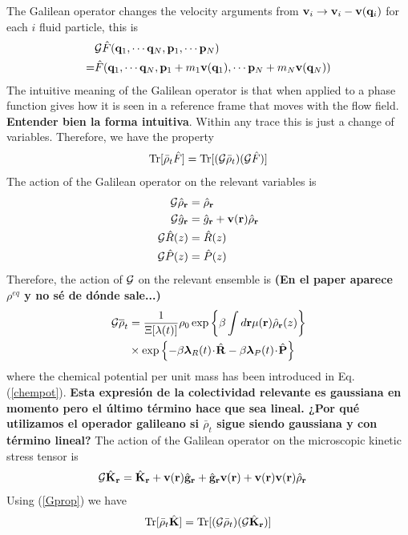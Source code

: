 \documentclass[a4paper,openright,12pt]{book}
\newcommand{\esc}{\!\cdot\!}
\newcommand{\Note}[1]{{\bf \color{red}#1}}    %
\begin{document}
The Galilean operator changes the velocity arguments from ${\bf v}_i\to {\bf v}_i-{\bf v}({\bf q}_i)$ for each $i$ fluid particle, this is
\begin{align}
&  {\cal G}\hat{F}({\bf q}_1,\cdots{\bf q}_N,{\bf p}_1,\cdots{\bf p}_N)
\nonumber\\
=&\hat{F}({\bf q}_1,\cdots{\bf q}_N,{\bf p}_1+m_1{\bf v}({\bf q}_1),\cdots{\bf p}_N+m_N{\bf v}({\bf q}_N))
\end{align}
The intuitive meaning of the Galilean operator is that when applied to a phase function gives how it is seen in a reference frame that moves with the flow field. \Note{Entender bien la forma intuitiva}. Within any trace this is just a change of variables. Therefore, we have the property
\begin{align}
  {\rm Tr}[\bar{\rho}_t\hat{F}] &= {\rm Tr}[({\cal G}\bar{\rho}_t)({\cal G}\hat{F})] \nonumber \\
  \label{Gprop}
\end{align}
The action of the Galilean operator on the relevant variables is
\begin{align}
  {\cal G}\hat{\rho}_{\bf r} &= \hat{\rho}_{\bf r} \nonumber\\
  {\cal G}\hat{g}_{\bf r} &= \hat{g}_{\bf r} + {\bf v}({\bf r})\hat{\rho}_{\bf r} \nonumber \\
  {\cal G}\hat{R}(z) &= \hat{R}(z) \nonumber\\
  {\cal G}\hat{P}(z) &= \hat{P}(z)
\end{align}
Therefore, the action of ${\cal G}$ on the relevant ensemble is \Note{(En el paper aparece $\rho^{eq}$ y no sé de dónde sale...)}
\begin{align}
  {\cal G}\overline{\rho}_t &=
\frac{1}{\Xi[\lambda(t)]}\rho_0
\exp\left\{\beta\int d{\bf r}\mu({\bf r})\hat{\rho}_{\bf r}(z)\right\}
\nonumber\\
&\times
\exp\left\{-\beta \boldsymbol{\lambda}_{R}(t)\esc\hat{\bf R}
-\beta \boldsymbol{\lambda}_{P}(t)\esc\hat{\bf P}\right\}
\label{resrelens}
\end{align}
where  the chemical  potential per  unit mass  has been  introduced in
Eq.  (\ref{chempot}).  \Note{Esta expresión de la colectividad relevante es gaussiana en momento pero el último término hace que sea lineal. ¿Por qué utilizamos el operador galileano si $\bar{\rho}_t$ sigue siendo gaussiana y con término lineal?}
The  action  of the  Galilean  operator on  the
microscopic kinetic stress tensor is
\begin{align}
  {\cal G}\hat{{\bf K}}_{\bf r} &=
\hat{{\bf K}}_{\bf r} 
+{\bf v}({\bf r})\hat{\bf g}_{\bf r}
+\hat{\bf g}_{\bf r}{\bf v}({\bf r})
+{\bf v}({\bf r}){\bf v}({\bf r})\hat{\rho}_{\bf r}
\end{align}
Using (\ref{Gprop}) we have
\begin{align}
  {\rm Tr}[\bar{\rho}_t\hat{{\bf K}}]={\rm Tr}[({\cal G}\bar{\rho}_t)({\cal G}\hat{{\bf K}}_{\bf r})]
\end{align}
\end{document}
